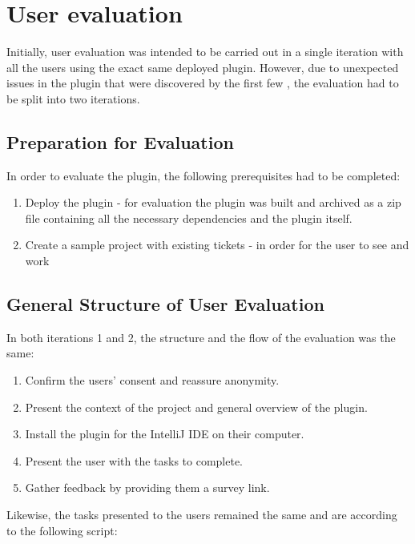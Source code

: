 \documentclass{4thYearProject}
\begin{document}

\section{User evaluation}\label{sec:usereval}

Initially, user evaluation was intended to be carried out in a single iteration with all the users using the exact same deployed plugin. However, due to unexpected issues in the plugin that were discovered by the first few , the evaluation had to be split into two iterations. 

\subsection{Preparation for Evaluation}

In order to evaluate the plugin, the following prerequisites had to be completed:

\begin{enumerate}
\item Deploy the plugin - for evaluation the plugin was built and archived as a zip file containing all the necessary dependencies and the plugin itself.
\item Create a sample project with existing tickets - in order for the user to see and work 
\end{enumerate}


\subsection{General Structure of User Evaluation}

In both iterations 1 and 2, the structure and the flow of the evaluation was the same:

\begin{enumerate}
\item Confirm the users' consent and reassure anonymity.
\item Present the context of the project and general overview of the plugin.
\item Install the plugin for the IntelliJ IDE on their computer.
\item Present the user with the tasks to complete.
\item Gather feedback by providing them a survey link.
\end{enumerate}

Likewise, the tasks presented to the users remained the same and are according to the following script:
\end{document}
